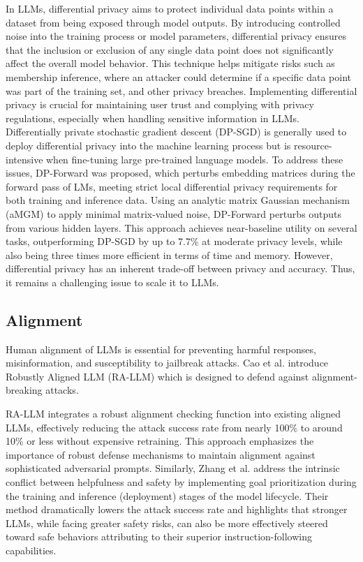 In LLMs, differential privacy aims to protect individual data points within a dataset from being exposed through model outputs. By introducing controlled noise into the training process or model parameters, differential privacy ensures that the inclusion or exclusion of any single data point does not significantly affect the overall model behavior. This technique helps mitigate risks such as membership inference, where an attacker could determine if a specific data point was part of the training set, and other privacy breaches. Implementing differential privacy is crucial for maintaining user trust and complying with privacy regulations, especially when handling sensitive information in LLMs. Differentially private stochastic gradient descent (DP-SGD) is generally used to deploy differential privacy into the machine learning process but is resource-intensive when fine-tuning large pre-trained language models. To address these issues, DP-Forward \cite{du_2023b} was proposed, which perturbs embedding matrices during the forward pass of LMs, meeting strict local differential privacy requirements for both training and inference data. Using an analytic matrix Gaussian mechanism (aMGM) to apply minimal matrix-valued noise, DP-Forward perturbs outputs from various hidden layers. This approach achieves near-baseline utility on several tasks, outperforming DP-SGD by up to 7.7\% at moderate privacy levels, while also being three times more efficient in terms of time and memory. However, differential privacy has an inherent trade-off between privacy and accuracy. Thus, it remains a challenging issue to scale it to LLMs.

\subsection{Alignment}

Human alignment of LLMs is essential for preventing harmful responses, misinformation, and susceptibility to jailbreak attacks. Cao et al. \cite{cao_2023a} introduce Robustly Aligned LLM (RA-LLM) which is designed to defend against alignment-breaking attacks. 

RA-LLM integrates a robust alignment checking function into existing aligned LLMs, effectively reducing the attack success rate from nearly 100\% to around 10\% or less without expensive retraining. This approach emphasizes the importance of robust defense mechanisms to maintain alignment against sophisticated adversarial prompts. Similarly, Zhang et al. \cite{zhang_2023b} address the intrinsic conflict between helpfulness and safety by implementing goal prioritization during the training and inference (deployment) stages of the model lifecycle. Their method dramatically lowers the attack success rate and highlights that stronger LLMs, while facing greater safety risks, can also be more effectively steered toward safe behaviors attributing to their superior instruction-following capabilities.

